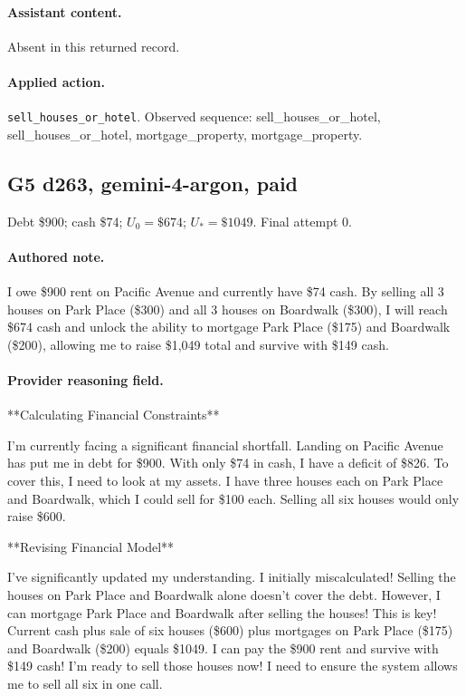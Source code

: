\paragraph{Assistant content.} Absent in this returned record.

\paragraph{Applied action.} \texttt{sell\_houses\_or\_hotel}. Observed sequence: sell\_houses\_or\_hotel, sell\_houses\_or\_hotel, mortgage\_property, mortgage\_property.

\subsection*{G5 d263, gemini-4-argon, paid}

\noindent Debt \$900; cash \$74; $U_0=\$674$; $U_*=\$1049$. Final attempt 0.\par

\paragraph{Authored note.} I owe \$900 rent on Pacific Avenue and currently have \$74 cash. By selling all 3 houses on Park Place (\$300) and all 3 houses on Boardwalk (\$300), I will reach \$674 cash and unlock the ability to mortgage Park Place (\$175) and Boardwalk (\$200), allowing me to raise \$1,049 total and survive with \$149 cash.

\paragraph{Provider reasoning field.} **Calculating Financial Constraints**

I'm currently facing a significant financial shortfall. Landing on Pacific Avenue has put me in debt for \$900. With only \$74 in cash, I have a deficit of \$826. To cover this, I need to look at my assets. I have three houses each on Park Place and Boardwalk, which I could sell for \$100 each. Selling all six houses would only raise \$600.


**Revising Financial Model**

I've significantly updated my understanding. I initially miscalculated! Selling the houses on Park Place and Boardwalk alone doesn't cover the debt. However, I can mortgage Park Place and Boardwalk after selling the houses! This is key! Current cash plus sale of six houses (\$600) plus mortgages on Park Place (\$175) and Boardwalk (\$200) equals \$1049. I can pay the \$900 rent and survive with \$149 cash! I'm ready to sell those houses now! I need to ensure the system allows me to sell all six in one call.




